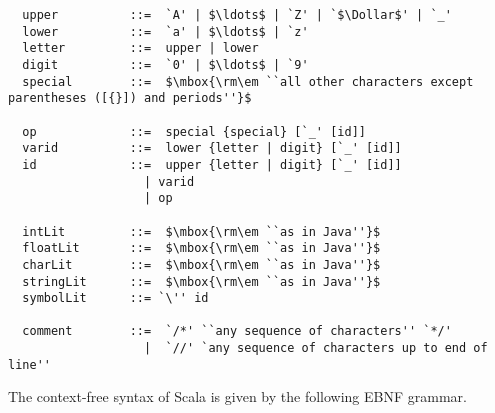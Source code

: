 \documentclass[a4paper,12pt,twoside,titlepage]{book}
\begin{document}
\begin{lstlisting}
  upper          ::=  `A' | $\ldots$ | `Z' | `$\Dollar$' | `_'
  lower          ::=  `a' | $\ldots$ | `z'
  letter         ::=  upper | lower
  digit          ::=  `0' | $\ldots$ | `9'
  special        ::=  $\mbox{\rm\em ``all other characters except parentheses ([{}]) and periods''}$

  op             ::=  special {special} [`_' [id]]
  varid          ::=  lower {letter | digit} [`_' [id]]
  id             ::=  upper {letter | digit} [`_' [id]]
                   | varid
                   | op

  intLit         ::=  $\mbox{\rm\em ``as in Java''}$
  floatLit       ::=  $\mbox{\rm\em ``as in Java''}$
  charLit        ::=  $\mbox{\rm\em ``as in Java''}$
  stringLit      ::=  $\mbox{\rm\em ``as in Java''}$
  symbolLit      ::= `\'' id

  comment        ::=  `/*' ``any sequence of characters'' `*/'
                   |  `//' `any sequence of characters up to end of line''
\end{lstlisting}

The context-free syntax of Scala is given by the following EBNF
grammar.
\end{document}
